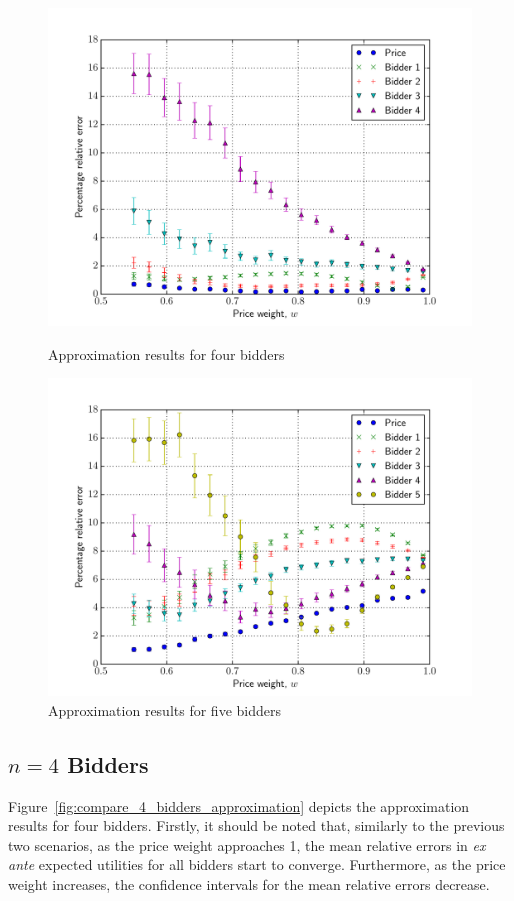 \begin{figure}[p!]
  \includegraphics[width=\figsize]{Approximation/Figures/compare_4_bidders}
  \caption{Approximation results for four bidders}
  \label{fig:compare_4_bidders_approximation}
  \vspace{10mm}
  \includegraphics[width=\figsize]{Approximation/Figures/compare_5_bidders}
  \caption{Approximation results for five bidders}
  \label{fig:compare_5_bidders_approximation}
\end{figure}

\subsection{$n=4$ Bidders} %
\label{sub:n_4_bidders_approximation}
Figure~\ref{fig:compare_4_bidders_approximation} depicts the approximation results for four bidders. Firstly, it should be noted that, similarly to the previous two scenarios, as the price weight approaches 1, the mean relative errors in \emph{ex ante} expected utilities for all bidders start to converge. Furthermore, as the price weight increases, the confidence intervals for the mean relative errors decrease.

